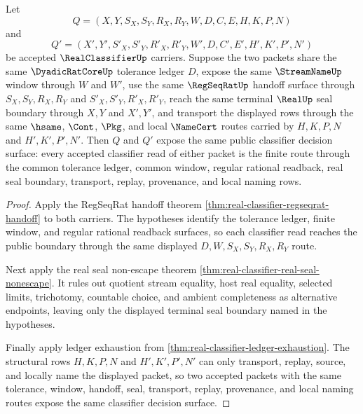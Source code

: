 \begin{theorem}
\label{thm:real-classifier-tolerance-window-determinacy}
Let
$$
Q=(X,Y,S_X,S_Y,R_X,R_Y,W,D,C,E,H,K,P,N)
$$
and
$$
Q'=(X',Y',S'_X,S'_Y,R'_X,R'_Y,W',D,C',E',H',K',P',N')
$$
be accepted $\RealClassifierUp$ carriers. Suppose the two packets share the same $\DyadicRatCoreUp$ tolerance ledger $D$, expose the same $\StreamNameUp$ window through $W$ and $W'$, use the same $\RegSeqRatUp$ handoff surface through $S_X,S_Y,R_X,R_Y$ and $S'_X,S'_Y,R'_X,R'_Y$, reach the same terminal $\RealUp$ seal boundary through $X,Y$ and $X',Y'$, and transport the displayed rows through the same $\hsame$, $\Cont$, $\Pkg$, and local $\NameCert$ routes carried by $H,K,P,N$ and $H',K',P',N'$. Then $Q$ and $Q'$ expose the same public classifier decision surface: every accepted classifier read of either packet is the finite route through the common tolerance ledger, common window, regular rational readback, real seal boundary, transport, replay, provenance, and local naming rows.
\end{theorem}
\begin{proof}
Apply the RegSeqRat handoff theorem \autoref{thm:real-classifier-regseqrat-handoff} to both carriers. The hypotheses identify the tolerance ledger, finite window, and regular rational readback surfaces, so each classifier read reaches the public boundary through the same displayed $D,W,S_X,S_Y,R_X,R_Y$ route.

Next apply the real seal non-escape theorem \autoref{thm:real-classifier-real-seal-nonescape}. It rules out quotient stream equality, host real equality, selected limits, trichotomy, countable choice, and ambient completeness as alternative endpoints, leaving only the displayed terminal seal boundary named in the hypotheses.

Finally apply ledger exhaustion from \autoref{thm:real-classifier-ledger-exhaustion}. The structural rows $H,K,P,N$ and $H',K',P',N'$ can only transport, replay, source, and locally name the displayed packet, so two accepted packets with the same tolerance, window, handoff, seal, transport, replay, provenance, and local naming routes expose the same classifier decision surface.
\end{proof}

